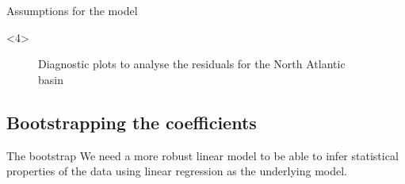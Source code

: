 \begin{frame}[label=intro-objectives]{Assumptions for the model}
	\begin{onlyenv}
		\begin{figure}[H]
			\centering
			\caption{Diagnostic plots to analyse the residuals for the North Atlantic basin}
			\label{fig:natl_residuals}
		\end{figure}
	\end{onlyenv}
\end{frame}


\subsection{Bootstrapping the coefficients}
\begin{frame}[label=intro-tc]{The bootstrap}
	We need a more robust linear model to be able to infer statistical properties of the data using linear regression as the underlying model.

	\medskip
	\footnotesize
	\IncMargin{1em}
	\begin{algorithm}[H]
		\caption{Resampling the cases using bootstrap}
		\label{alg:bootstrap-theory}
		\DontPrintSemicolon
	\end{algorithm}
	\DecMargin{1em}
\end{frame}

